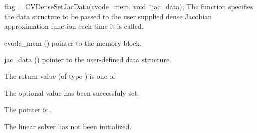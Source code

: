 {
  flag = CVDenseSetJacData(cvode\_mem, void *jac\_data);
}
{
  The function  specifies the data structure
  to be passed to the user supplied dense Jacobian approximation 
  function each time it is called.
}
{
  \begin{args}
  \item[cvode\_mem] ()
    pointer to the {\cvodes} memory block.
  \item[jac\_data] ()
    pointer to the user-defined data structure.
  \end{args}
}
{
  The return value  (of type ) is one of
  \begin{args}
  \item[\Id{SUCCESS}] 
    The optional value has been successfuly set.
  \item[\Id{LIN\_NO\_MEM}]
    The  pointer is .
  \item[\Id{LIN\_NO\_LMEM}]
    The {\cvdense} linear solver has not been initialized.
  \end{args}
}
{}
